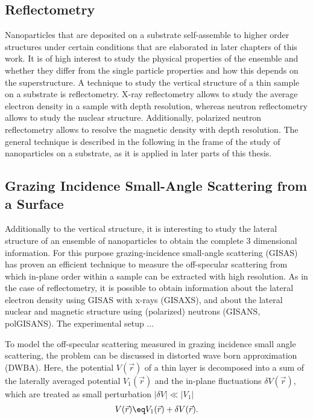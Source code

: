 \documentclass[\main/dresen_thesis.tex]{subfiles}
\begin{document}
\subsection{Reflectometry}\label{sec:theoreticalBackground:scattering:reflectometry}
Nanoparticles that are deposited on a substrate self-assemble to higher order structures under certain conditions that are elaborated in later chapters of this work.
It is of high interest to study the physical properties of the ensemble and whether they differ from the single particle properties and how this depends on the superstructure.
A technique to study the vertical structure of a thin sample on a substrate is reflectometry.
X-ray reflectometry allows to study the average electron density in a sample with depth resolution, whereas neutron reflectometry allows to study the nuclear structure.
Additionally, polarized neutron reflectometry allows to resolve the magnetic density with depth resolution.
The general technique is described in the following in the frame of the study of nanoparticles on a substrate, as it is applied in later parts of this thesis.

\subsection{Grazing Incidence Small-Angle Scattering from a Surface}\label{sec:theoreticalBackground:scattering:GISAS}
Additionally to the vertical structure, it is interesting to study the lateral structure of an ensemble of nanoparticles to obtain the complete 3 dimensional information.
For this purpose grazing-incidence small-angle scattering (GISAS) has proven an efficient technique to measure the off-specular scattering from which in-plane order within a sample can be extracted with high resolution.
As in the case of reflectometry, it is possible to obtain information about the lateral electron density using GISAS with x-rays (GISAXS), and about the lateral nuclear and magnetic structure using (polarized) neutrons (GISANS, polGISANS).
The experimental setup ...

To model the off-specular scattering measured in grazing incidence small angle scattering, the problem can be discussed in distorted wave born approximation (DWBA). Here, the potential $V(\vec{r})$ of a thin layer is decomposed into a sum of the laterally averaged potential $V_1(\vec{r})$ and the in-plane fluctuations $\delta V(\vec{r})$, which are treated as small perturbation $|\delta V| \ll |V_1|$
\begin{align}
  V(\vec{r}) \eq V_1(\vec{r}) + \delta V(\vec{r}).
\end{align}
\end{document}
